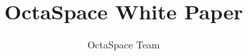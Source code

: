 \documentclass[a4paper]{article}
\begin{document}
\title{OctaSpace White Paper}

\author{OctaSpace Team}

\maketitle

\tableofcontents
\newpage


\newpage

\newpage

\newpage

\newpage

\newpage




\end{document}
